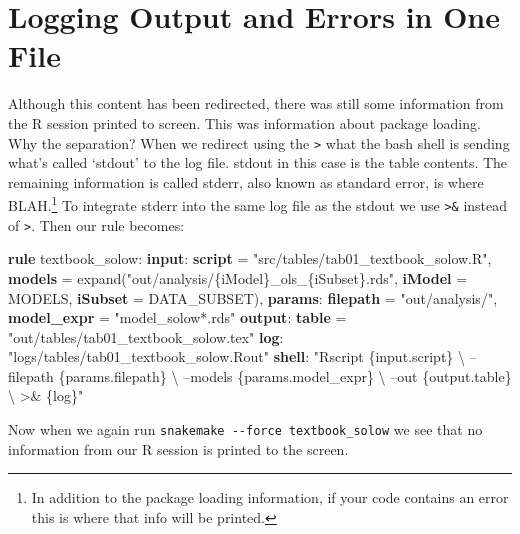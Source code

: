 \documentclass[]{book}
\newenvironment{Shaded}{\begin{snugshade}}{\end{snugshade}}
\newcommand{\KeywordTok}[1]{\textcolor[rgb]{0.13,0.29,0.53}{\textbf{{#1}}}}
\newcommand{\StringTok}[1]{\textcolor[rgb]{0.31,0.60,0.02}{{#1}}}
\newcommand{\NormalTok}[1]{{#1}}
\let\rmarkdownfootnote\footnote%
\def\footnote{\protect\rmarkdownfootnote}
\theoremstyle{definition}
\theoremstyle{definition}
\theoremstyle{definition}
\theoremstyle{remark}
\begin{document}
\section{Logging Output and Errors in One
File}\label{logging-output-and-errors-in-one-file}

Although this content has been redirected, there was still some
information from the R session printed to screen. This was information
about package loading. Why the separation? When we redirect using the
\texttt{\textgreater{}} what the bash shell is sending what's called
`stdout' to the log file. stdout in this case is the table contents. The
remaining information is called stderr, also known as standard error, is
where BLAH.\footnote{In addition to the package loading information, if
  your code contains an error this is where that info will be printed.}
To integrate stderr into the same log file as the stdout we use
\texttt{\textgreater{}\&} instead of \texttt{\textgreater{}}. Then our
rule becomes:

\begin{Shaded}
\begin{Highlighting}[]
\KeywordTok{rule} \NormalTok{textbook_solow:}
    \KeywordTok{input}\NormalTok{:}
        \KeywordTok{script} \NormalTok{= }\StringTok{"src/tables/tab01_textbook_solow.R"}\NormalTok{,}
        \KeywordTok{models} \NormalTok{= expand(}\StringTok{"out/analysis/\{iModel\}_ols_\{iSubset\}.rds"}\NormalTok{,}
                            \KeywordTok{iModel} \NormalTok{= MODELS,}
                            \KeywordTok{iSubset} \NormalTok{= DATA_SUBSET),}
    \KeywordTok{params}\NormalTok{:}
        \KeywordTok{filepath}   \NormalTok{= }\StringTok{"out/analysis/"}\NormalTok{,}
        \KeywordTok{model_expr} \NormalTok{= }\StringTok{"model_solow*.rds"}
    \KeywordTok{output}\NormalTok{:}
        \KeywordTok{table} \NormalTok{= }\StringTok{"out/tables/tab01_textbook_solow.tex"}
    \KeywordTok{log}\NormalTok{:}
        \StringTok{"logs/tables/tab01_textbook_solow.Rout"}
    \KeywordTok{shell}\NormalTok{:}
        \StringTok{"Rscript \{input.script\} \textbackslash{}}
\StringTok{            --filepath \{params.filepath\} \textbackslash{}}
\StringTok{            --models \{params.model_expr\} \textbackslash{}}
\StringTok{            --out \{output.table\} \textbackslash{}}
\StringTok{            >& \{log\}"}
\end{Highlighting}
\end{Shaded}

Now when we again run \texttt{snakemake\ -\/-force\ textbook\_solow} we
see that no information from our R session is printed to the screen.
\end{document}
